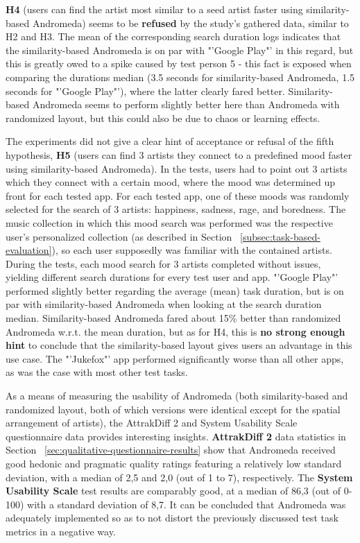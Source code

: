\textbf{H4} (users can find the artist most similar to a seed artist faster using  similarity-based Andromeda) seems to be \textbf{refused} by the study's gathered data, similar to H2 and H3. The mean of the corresponding search duration logs indicates that the similarity-based Andromeda is on par with "'Google Play"' in this regard, but this is greatly owed to a spike caused by test person 5 - this fact is exposed when comparing the durations median (3.5 seconds for similarity-based Andromeda, 1.5 seconds for "'Google Play"'), where the latter clearly fared better. Similarity-based Andromeda seems to perform slightly better here than Andromeda with randomized layout, but this could also be due to chaos or learning effects.

The experiments did not give a clear hint of acceptance or refusal of the fifth hypothesis, \textbf{H5} (users can find 3 artists they connect to a predefined mood faster using similarity-based Andromeda). In the tests, users had to point out 3 artists which they connect with a certain mood, where the mood was determined up front for each tested app. For each tested app, one of these moods was randomly selected for the search of 3 artists: happiness, sadness, rage, and boredness. The music collection in which this mood search was performed was the respective user's personalized collection (as described in Section ~\ref{subsec:task-based-evaluation}), so each user supposedly was familiar with the contained artists. During the tests, each mood search for 3 artists completed without issues, yielding different search durations for every test user and app. "'Google Play"' performed slightly better regarding the average (mean) task duration, but is on par with similarity-based Andromeda when looking at the search duration median. Similarity-based Andromeda fared about 15\% better than randomized Andromeda w.r.t. the mean duration, but as for H4, this is \textbf{no strong enough hint} to conclude that the similarity-based layout gives users an advantage in this use case. The "'Jukefox"' app performed significantly worse than all other apps, as was the case with most other test tasks.

As a means of measuring the usability of Andromeda (both similarity-based and randomized layout, both of which versions were identical except for the spatial arrangement of artists), the AttrakDiff 2 and System Usability Scale questionnaire data provides interesting insights. \textbf{AttrakDiff 2} data statistics in Section ~\ref{sec:qualitative-questionnaire-results} show that Andromeda received good hedonic and pragmatic quality ratings featuring a relatively low standard deviation, with a median of 2,5 and 2,0 (out of 1 to 7), respectively. The \textbf{System Usability Scale} test results are comparably good, at a median of 86,3 (out of 0-100) with a standard deviation of 8,7. It can be concluded that Andromeda was adequately implemented so as to not distort the previously discussed test task metrics in a negative way.

